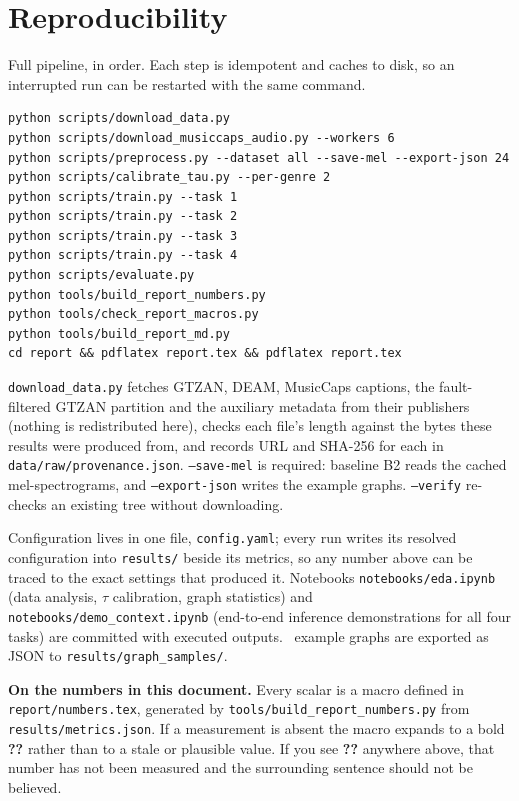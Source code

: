 \documentclass[10pt,a4paper]{article}
\begin{document}
\appendix
\section{Reproducibility}
Full pipeline, in order. Each step is idempotent and caches to disk, so an
interrupted run can be restarted with the same command.

\begin{verbatim}
python scripts/download_data.py
python scripts/download_musiccaps_audio.py --workers 6
python scripts/preprocess.py --dataset all --save-mel --export-json 24
python scripts/calibrate_tau.py --per-genre 2
python scripts/train.py --task 1
python scripts/train.py --task 2
python scripts/train.py --task 3
python scripts/train.py --task 4
python scripts/evaluate.py
python tools/build_report_numbers.py
python tools/check_report_macros.py
python tools/build_report_md.py
cd report && pdflatex report.tex && pdflatex report.tex
\end{verbatim}

\noindent
\texttt{download\_data.py} fetches GTZAN, DEAM, MusicCaps captions, the
fault-filtered GTZAN partition and the auxiliary metadata from their publishers
(nothing is redistributed here), checks each file's length against the bytes these
results were produced from, and records URL and SHA-256 for each in
\texttt{data/raw/provenance.json}. \texttt{--save-mel} is required: baseline B2
reads the cached mel-spectrograms, and \texttt{--export-json} writes the example
graphs. \texttt{--verify} re-checks an existing tree without downloading.

\noindent
Configuration lives in one file, \texttt{config.yaml}; every run writes its
resolved configuration into \texttt{results/} beside its metrics, so any number
above can be traced to the exact settings that produced it. Notebooks
\texttt{notebooks/eda.ipynb} (data analysis, $\tau$ calibration, graph
statistics) and \texttt{notebooks/demo\_context.ipynb} (end-to-end inference
demonstrations for all four tasks) are committed with executed outputs.
\nExportedGraphs\ example graphs are exported as JSON to
\texttt{results/graph\_samples/}.

\noindent
\textbf{On the numbers in this document.} Every scalar is a macro defined in
\texttt{report/numbers.tex}, generated by \texttt{tools/build\_report\_numbers.py}
from \texttt{results/metrics.json}. If a measurement is absent the macro expands
to a bold \textbf{??} rather than to a stale or plausible value. If you see
\textbf{??} anywhere above, that number has not been measured and the surrounding
sentence should not be believed.
\end{document}

